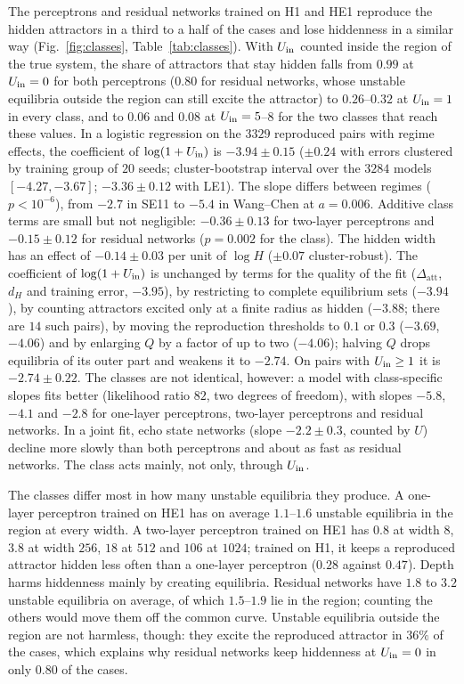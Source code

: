 The perceptrons and residual networks trained on H1 and HE1 reproduce the hidden attractors in a third to a half of the
cases and lose hiddenness in a similar way (Fig.~\ref{fig:classes}, Table~\ref{tab:classes}). With $U_{\mathrm{in}}$ counted inside the
region of the true system, the share of attractors that stay hidden falls from $0.99$ at $U_{\mathrm{in}}=0$ for both perceptrons
($0.80$ for residual networks, whose unstable equilibria outside the region can still excite the attractor) to
$0.26$--$0.32$ at $U_{\mathrm{in}}=1$ in every class, and to $0.06$ and $0.08$ at $U_{\mathrm{in}}=5$--$8$ for the two classes that reach these
values. In a logistic regression on the $3329$ reproduced pairs with regime effects, the coefficient of $\log(1+U_{\mathrm{in}})$ is
$-3.94\pm0.15$ ($\pm0.24$ with errors clustered by training group of $20$ seeds; cluster-bootstrap interval over the
$3284$ models $[-4.27,-3.67]$; $-3.36\pm0.12$ with LE1). The slope differs between regimes ($p<10^{-6}$), from $-2.7$
in SE11 to $-5.4$ in Wang--Chen at $a=0.006$. Additive class terms are small but not negligible:
$-0.36\pm0.13$ for two-layer perceptrons and $-0.15\pm0.12$ for residual networks ($p=0.002$ for the class). The hidden width
has an effect of $-0.14\pm0.03$ per unit of $\log H$ ($\pm0.07$ cluster-robust). The coefficient of $\log(1+U_{\mathrm{in}})$ is
unchanged by terms for the quality of the fit ($\Delta_{\mathrm{att}}$, $d_H$ and training error, $-3.95$), by restricting
to complete equilibrium sets ($-3.94$), by counting attractors excited only at a finite radius as hidden ($-3.88$; there
are $14$ such pairs), by moving the reproduction thresholds to $0.1$ or $0.3$ ($-3.69$, $-4.06$) and by enlarging $Q$ by a
factor of up to two ($-4.06$); halving $Q$ drops equilibria of its outer part and weakens it to $-2.74$. On pairs with
$U_{\mathrm{in}}\ge1$ it is $-2.74\pm0.22$. The classes are not identical, however: a model with class-specific slopes fits
better (likelihood ratio $82$, two degrees of freedom), with slopes $-5.8$, $-4.1$ and $-2.8$ for one-layer perceptrons,
two-layer perceptrons and residual networks. In a joint fit, echo state networks (slope $-2.2\pm0.3$, counted by $U$)
decline more slowly than both perceptrons and about as fast as residual networks. The class acts mainly, not only,
through $U_{\mathrm{in}}$.

The classes differ most in how many unstable equilibria they produce. A one-layer perceptron trained on HE1 has on average
$1.1$--$1.6$ unstable equilibria in the region at every width. A two-layer perceptron trained on HE1 has $0.8$ at width $8$,
$3.8$ at width $256$, $18$ at $512$ and $106$ at $1024$; trained on H1, it keeps a reproduced attractor hidden less often
than a one-layer perceptron ($0.28$ against $0.47$). Depth harms hiddenness mainly by creating equilibria. Residual networks have $1.8$ to $3.2$ unstable equilibria on
average, of which $1.5$--$1.9$ lie in the region; counting the others would move them off the common curve. Unstable
equilibria outside the region are not harmless, though: they excite the reproduced attractor in $36\%$ of the cases, which
explains why residual networks keep hiddenness at $U_{\mathrm{in}}=0$ in only $0.80$ of the cases.

